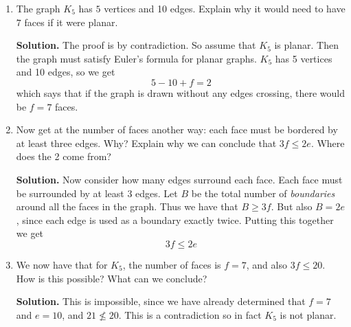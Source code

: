 \documentclass{book}
\begin{document}
\setcounter{project}{27}
\addtocounter{project}{-1}
\begin{activity}[]\label{activity-22}
\leavevmode%
\begin{enumerate}[font=\bfseries,label=(\alph*),ref=\alph*]
\item\label{task-36} \hypertarget{p-283}{}%
The graph \(K_5\) has \(5\) vertices and 10 edges.  Explain why it would need to have \(7\) faces if it were planar.%
\par\smallskip%
\noindent\textbf{Solution.}\hypertarget{solution-19}{}\quad%
\hypertarget{p-284}{}%
The proof is by contradiction. So assume that \(K_5\) is planar. Then the graph must satisfy Euler's formula for planar graphs. \(K_5\) has 5 vertices and 10 edges, so we get%
\begin{equation*}
5 - 10 + f = 2
\end{equation*}
which says that if the graph is drawn without any edges crossing, there would be \(f = 7\) faces.%
\item\label{task-37} \hypertarget{p-285}{}%
Now get at the number of faces another way: each face must be bordered by at least three edges.  Why?  Explain why we can conclude that \(3f \le 2e\).  Where does the 2 come from?%
\par\smallskip%
\noindent\textbf{Solution.}\hypertarget{solution-20}{}\quad%
\hypertarget{p-286}{}%
Now consider how many edges surround each face. Each face must be surrounded by at least 3 edges. Let \(B\) be the total number of \emph{boundaries} around all the faces in the graph. Thus we have that \(B \ge 3f\). But also \(B = 2e\), since each edge is used as a boundary exactly twice. Putting this together we get%
\begin{equation*}
3f \le 2e
\end{equation*}
%
\item\label{task-38} \hypertarget{p-287}{}%
We now have that for \(K_5\), the number of faces is \(f = 7\), and also \(3f \le 20\).  How is this possible?  What can we conclude?%
\par\smallskip%
\noindent\textbf{Solution.}\hypertarget{solution-21}{}\quad%
\hypertarget{p-288}{}%
This is impossible, since we have already determined that \(f = 7\) and \(e = 10\), and \(21 \not\le 20\). This is a contradiction so in fact \(K_5\) is not planar.%
\end{enumerate}
\end{activity}

\clearpage
\end{document}
